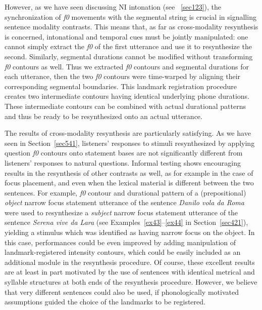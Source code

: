 However, as we have seen discussing NI intonation (see ~\ref{sec123}), the synchronization of \textit{f0} movements with the segmental string is crucial in signalling sentence modality contrasts. This means that, as far as cross-modality resynthesis is concerned, intonational and temporal cues must be jointly manipulated: one cannot simply extract the \textit{f0} of the first utterance and use it to resynthesize the second. Similarly, segmental durations cannot be modified without transforming \textit{f0} contours as well. Thus we extracted \textit{f0} contours and segmental durations for each utterance, then the two \textit{f0} contours were time-warped by aligning their corresponding segmental boundaries. This landmark registration procedure creates two intermediate contours having identical underlying phone durations. These intermediate contours can be combined with actual durational patterns and thus be ready to be resynthesized onto an actual utterance. 

The results of cross-modality resynthesis are particularly satisfying. As we have seen in Section~\ref{sec541}, listeners' responses to stimuli resynthesized by applying question \textit{f0} contours onto statement bases are not significantly different from listeners' responses to natural questions. Informal testing shows encouraging results in the resynthesis of other contrasts as well, as for example in the case of focus placement, and even when the lexical material is different between the two sentences. For example, \textit{f0} contour and durational pattern of a (prepositional) \textit{object} narrow focus statement utterance of the sentence \textit{Danilo vola da Roma} were used to resynthesize a \textit{subject} narrow focus statement utterance of the sentence \textit{Serena vive da Lara} (see Examples~\ref{ex43}--\ref{ex44} in Section~\ref{sec421}), yielding a stimulus which was identified as having narrow focus on the object. In this case, performances could be even improved by adding manipulation of landmark-registered intensity contours, which could be easily included as an additional module in the resynthesis procedure. Of course, these excellent results are at least in part motivated by the use of sentences with identical metrical and syllable structures at both ends of the resynthesis procedure. However, we believe that very different sentences could also be used, if phonologically motivated assumptions guided the choice of the landmarks to be registered.

